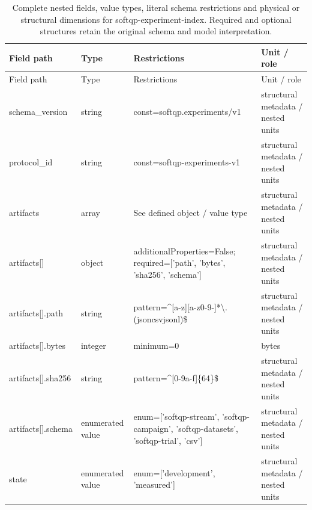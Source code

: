 \begingroup\footnotesize\setlength{\tabcolsep}{3pt}
\begin{longtable}{@{}>{\raggedright\arraybackslash}p{}>{\raggedright\arraybackslash}p{}>{\raggedright\arraybackslash}p{}>{\raggedright\arraybackslash}p{}@{}}
\caption{Complete nested fields, value types, literal schema restrictions and physical or structural dimensions for softqp-experiment-index. Required and optional structures retain the original schema and model interpretation.}\label{tab:nested-softqp-experiment-index}\\
\toprule Field path & Type & Restrictions & Unit / role\\\midrule\endfirsthead
\toprule Field path & Type & Restrictions & Unit / role\\\midrule\endhead
\bottomrule\endfoot
schema\_\allowbreak{}version & string & const=\allowbreak{}softqp.\allowbreak{}experiments/\allowbreak{}v1 & structural metadata /\allowbreak{} nested units\\
protocol\_\allowbreak{}id & string & const=\allowbreak{}softqp-\allowbreak{}experiments-\allowbreak{}v1 & structural metadata /\allowbreak{} nested units\\
artifacts & array & See defined object /\allowbreak{} value type & structural metadata /\allowbreak{} nested units\\
artifacts[] & object & additionalProperties=\allowbreak{}False; required=\allowbreak{}['path', 'bytes', 'sha256', 'schema'] & structural metadata /\allowbreak{} nested units\\
artifacts[].\allowbreak{}path & string & pattern=\allowbreak{}\textasciicircum{}[a-\allowbreak{}z][a-\allowbreak{}z0-9-]*\textbackslash{}.\allowbreak{}(json\textbar{}\allowbreak{}csv\textbar{}\allowbreak{}jsonl)\$ & structural metadata /\allowbreak{} nested units\\
artifacts[].\allowbreak{}bytes & integer & minimum=\allowbreak{}0 & bytes\\
artifacts[].\allowbreak{}sha256 & string & pattern=\allowbreak{}\textasciicircum{}[0-9a-\allowbreak{}f]\{64\}\$ & structural metadata /\allowbreak{} nested units\\
artifacts[].\allowbreak{}schema & enumerated value & enum=\allowbreak{}['softqp-\allowbreak{}stream', 'softqp-\allowbreak{}campaign', 'softqp-\allowbreak{}datasets', 'softqp-\allowbreak{}trial', 'csv'] & structural metadata /\allowbreak{} nested units\\ %
state & enumerated value & enum=\allowbreak{}['development', 'measured'] & structural metadata /\allowbreak{} nested units\\
\end{longtable}\endgroup
